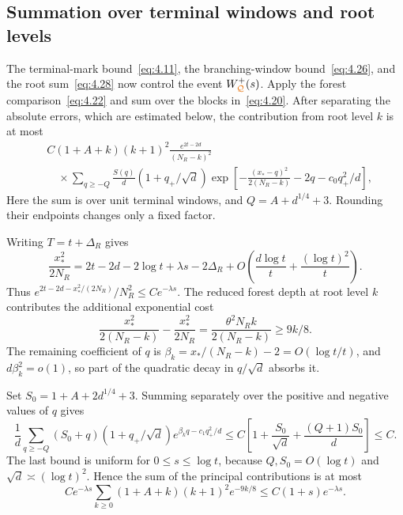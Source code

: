 \documentclass[11pt,letterpaper,reqno]{amsart}
\newif\ifrevmarks \revmarkstrue
\newcommand{\add}[1]{\ifrevmarks\textcolor{revorange}{#1}\else#1\fi}
\newcommand{\ren}[2]{\add{#2}}%
\numberwithin{equation}{section}
\theoremstyle{remark}
\begin{document}
\subsection{Summation over terminal windows and root levels}\label{sec:uppersum}
The terminal-mark bound~\eqref{eq:4.11}, the branching-window bound~\eqref{eq:4.26}, and the root sum~\eqref{eq:4.28} now control the event $W_{\ren{C}{\mathcal Q}}^+(s)$. Apply the forest comparison~\eqref{eq:4.22} and sum over the blocks in~\eqref{eq:4.20}. After separating the absolute errors, which are estimated below, the contribution from root level $k$ is at most
\begin{equation}\label{eq:4.29}
\begin{split}
&C(1+A+k)(k+1)^2\frac{e^{2t-2d}}{(N_R-k)^2}\\
&\quad\times\sum_{q\ge-Q}\frac{S(q)}d
(1+q_+/\sqrt d)
\exp\left[-\frac{(x_*-q)^2}{2(N_R-k)}-2q-c_0q_+^2/d\right],
\end{split}
\end{equation}
Here the sum is over unit terminal windows, and $Q=A+d^{1/4}+3$. Rounding their endpoints changes only a fixed factor.

Writing $T=t+\Delta_R$ gives
\begin{equation}\label{eq:4.30}
\frac{x_*^2}{2N_R}
=2t-2d-2\log t+\lambda s-2\Delta_R
+O\left(\frac{d\log t}{t}+\frac{(\log t)^2}{t}\right).
\end{equation}
Thus $e^{2t-2d-x_*^2/(2N_R)}/N_R^2\le Ce^{-\lambda s}$. The reduced forest depth at root level $k$ contributes the additional exponential cost
\begin{equation}\label{eq:4.31}
\frac{x_*^2}{2(N_R-k)}-\frac{x_*^2}{2N_R}
=\frac{\theta^2 N_R k}{2(N_R-k)}\ge9k/8.
\end{equation}
The remaining coefficient of $q$ is
$\beta_k=x_* /(N_R-k)-2=O(\log t/t)$, and $d\beta_k^2=o(1)$, so part of the quadratic decay in $q/\sqrt d$ absorbs it.

Set $S_0=1+A+2d^{1/4}+3$. Summing separately over the positive and negative values of $q$ gives
\begin{equation}\label{eq:4.32}
\frac1d\sum_{q\ge-Q}(S_0+q)(1+q_+/\sqrt d)
 e^{\beta_kq-c_1q_+^2/d}
\le C\left[1+\frac{S_0}{\sqrt d}+\frac{(Q+1)S_0}{d}\right]\le C.
\end{equation}
The last bound is uniform for $0\le s\le\log t$, because $Q,S_0=O(\log t)$ and $\sqrt d\asymp(\log t)^2$. Hence the sum of the principal contributions is at most
\begin{equation}\label{eq:4.33}
Ce^{-\lambda s}\sum_{k\ge0}(1+A+k)(k+1)^2e^{-9k/8}
\le C(1+s)e^{-\lambda s}.
\end{equation}
\end{document}
